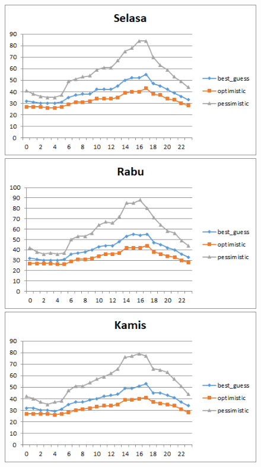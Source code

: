 \begin{figure}[H]
				\centering		
				\includegraphics[]{Gambar/selasasampel224072017normal.png}
				\includegraphics[]{Gambar/rabusampel224072017normal.png}
				\includegraphics[]{Gambar/kamissampel224072017normal.png}
\end{figure}			
			
